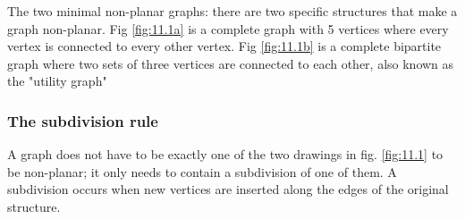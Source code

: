The two minimal non-planar graphs: there are two specific structures that make a graph non-planar. Fig \ref{fig:11.1a} is a complete graph with 5 vertices where every vertex is connected to every other vertex. Fig \ref{fig:11.1b} is a complete bipartite graph where two sets of three vertices are connected to each other, also known as the "utility graph"

\subsubsection{The subdivision rule}
A graph does not have to be exactly one of the two drawings in fig. \ref{fig:11.1} to be non-planar; it only needs to contain a subdivision of one of them. A subdivision occurs when new vertices are inserted along the edges of the original structure.